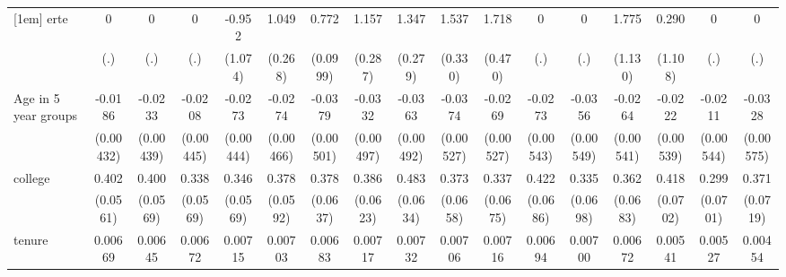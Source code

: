 {\begin{tabular}{l*{16}{c}}
[1em]
erte                &           0         &           0         &           0         &      -0.952         &       1.049\sym{***}&       0.772\sym{***}&       1.157\sym{***}&       1.347\sym{***}&       1.537\sym{***}&       1.718\sym{***}&           0         &           0         &       1.775         &       0.290         &           0         &           0         \\
                    &         (.)         &         (.)         &         (.)         &     (1.074)         &     (0.268)         &    (0.0999)         &     (0.287)         &     (0.279)         &     (0.330)         &     (0.470)         &         (.)         &         (.)         &     (1.130)         &     (1.108)         &         (.)         &         (.)         \\
[1em]
Age in 5 year groups&     -0.0186\sym{***}&     -0.0233\sym{***}&     -0.0208\sym{***}&     -0.0273\sym{***}&     -0.0274\sym{***}&     -0.0379\sym{***}&     -0.0332\sym{***}&     -0.0363\sym{***}&     -0.0374\sym{***}&     -0.0269\sym{***}&     -0.0273\sym{***}&     -0.0356\sym{***}&     -0.0264\sym{***}&     -0.0222\sym{***}&     -0.0211\sym{***}&     -0.0328\sym{***}\\
                    &   (0.00432)         &   (0.00439)         &   (0.00445)         &   (0.00444)         &   (0.00466)         &   (0.00501)         &   (0.00497)         &   (0.00492)         &   (0.00527)         &   (0.00527)         &   (0.00543)         &   (0.00549)         &   (0.00541)         &   (0.00539)         &   (0.00544)         &   (0.00575)         \\
[1em]
college             &       0.402\sym{***}&       0.400\sym{***}&       0.338\sym{***}&       0.346\sym{***}&       0.378\sym{***}&       0.378\sym{***}&       0.386\sym{***}&       0.483\sym{***}&       0.373\sym{***}&       0.337\sym{***}&       0.422\sym{***}&       0.335\sym{***}&       0.362\sym{***}&       0.418\sym{***}&       0.299\sym{***}&       0.371\sym{***}\\
                    &    (0.0561)         &    (0.0569)         &    (0.0569)         &    (0.0569)         &    (0.0592)         &    (0.0637)         &    (0.0623)         &    (0.0634)         &    (0.0658)         &    (0.0675)         &    (0.0686)         &    (0.0698)         &    (0.0683)         &    (0.0702)         &    (0.0701)         &    (0.0719)         \\
[1em]
tenure              &     0.00669\sym{***}&     0.00645\sym{***}&     0.00672\sym{***}&     0.00715\sym{***}&     0.00703\sym{***}&     0.00683\sym{***}&     0.00717\sym{***}&     0.00732\sym{***}&     0.00706\sym{***}&     0.00716\sym{***}&     0.00694\sym{***}&     0.00700\sym{***}&     0.00672\sym{***}&     0.00541\sym{***}&     0.00527\sym{***}&     0.00454\sym{***}\\

\end{tabular}}
